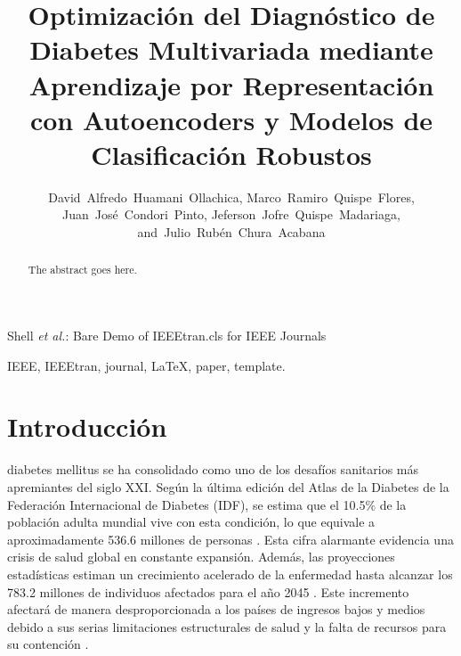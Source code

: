 \documentclass[journal]{IEEEtran}
\begin{document}
\title{Optimización del Diagnóstico de Diabetes Multivariada mediante Aprendizaje por Representación con Autoencoders y Modelos de Clasificación Robustos}

\author{David~Alfredo~Huamani~Ollachica,
        Marco~Ramiro~Quispe~Flores,
        Juan~José~Condori~Pinto,
        Jeferson~Jofre~Quispe~Madariaga,\\
        and~Julio~Rubén~Chura~Acabana%
}



%
{Shell \MakeLowercase{\textit{et al.}}: Bare Demo of IEEEtran.cls for IEEE Journals}


\maketitle

\begin{abstract}
The abstract goes here.
\end{abstract}

\begin{IEEEkeywords}
IEEE, IEEEtran, journal, \LaTeX, paper, template.
\end{IEEEkeywords}

\IEEEpeerreviewmaketitle




\section{Introducción}

 diabetes mellitus se ha consolidado como uno de los desafíos sanitarios más apremiantes del siglo XXI. Según la última edición del Atlas de la Diabetes de la Federación Internacional de Diabetes (IDF), se estima que el 10.5\% de la población adulta mundial vive con esta condición, lo que equivale a aproximadamente 536.6 millones de personas \cite{Sun2022, Sun2023}. Esta cifra alarmante evidencia una crisis de salud global en constante expansión. Además, las proyecciones estadísticas estiman un crecimiento acelerado de la enfermedad hasta alcanzar los 783.2 millones de individuos afectados para el año 2045 \cite{Sun2022, Duncan2026}. Este incremento afectará de manera desproporcionada a los países de ingresos bajos y medios debido a sus serias limitaciones estructurales de salud y la falta de recursos para su contención \cite{Ogurtsova2022}.
\end{document}
